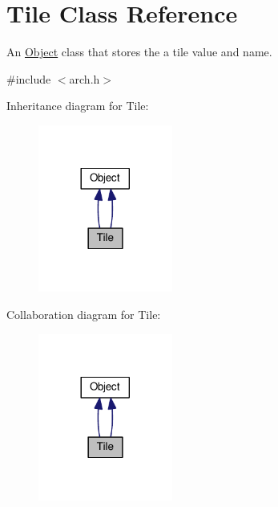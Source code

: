 \hypertarget{classTile}{}\section{Tile Class Reference}
\label{classTile}


An \hyperlink{classObject}{Object} class that stores the a tile value and name.  




{\ttfamily \#include $<$arch.\+h$>$}



Inheritance diagram for Tile\+:
\nopagebreak
\begin{figure}[H]
\begin{center}
\leavevmode
\includegraphics[width=125pt]{classTile__inherit__graph}
\end{center}
\end{figure}


Collaboration diagram for Tile\+:
\nopagebreak
\begin{figure}[H]
\begin{center}
\leavevmode
\includegraphics[width=125pt]{classTile__coll__graph}
\end{center}
\end{figure}
